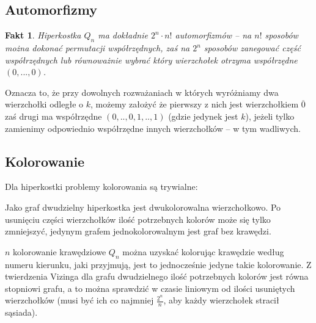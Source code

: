 \documentclass{pracamgr}
\newtheorem{fact}[theorem]{Fakt}
\begin{document}
   \subsection{Automorfizmy}
    \begin{fact}
     Hiperkostka $Q_n$ ma dokładnie $2^n\cdot n!$ automorfizmów -- na $n!$ sposobów można dokonać permutacji współrzędnych, zaś na $2^n$ sposobów
     zanegować część współrzędnych lub równoważnie wybrać który wierzchołek otrzyma współrzędne $(0,...,0)$.
    \end{fact}
    Oznacza to, że przy dowolnych rozważaniach w których wyróżniamy dwa wierzchołki odległe o $k$, możemy założyć że pierwszy z nich jest wierzchołkiem $\overline{0}$
    zaś drugi ma współrzędne $(0,..,0,1,..,1)$ (gdzie jedynek jest $k$), jeżeli tylko zamienimy odpowiednio współrzędne innych wierzchołków -- w tym wadliwych.
   \subsection{Kolorowanie}
    Dla hiperkostki problemy kolorowania są trywialne:
    
    Jako graf dwudzielny hiperkostka jest dwukolorowalna wierzchołkowo. Po usunięciu części wierzchołków ilość potrzebnych kolorów może się tylko zmniejszyć,
    jedynym grafem jednokolorowalnym jest graf bez krawędzi.
 
    $n$ kolorowanie krawędziowe $Q_n$ można uzyskać kolorując krawędzie według numeru kierunku, jaki przyjmują, jest to jednocześnie jedyne takie kolorowanie.
    Z twierdzenia Vizinga dla grafu dwudzielnego ilość potrzebnych kolorów jest równa stopniowi grafu, a to można sprawdzić w czasie liniowym od ilości
    usuniętych wierzchołków (musi być ich co najmniej $\frac{2^n}{n}$, aby każdy wierzchołek stracił sąsiada).
\end{document}
